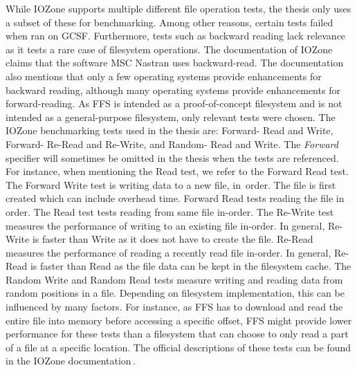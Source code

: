 While IOZone supports multiple different file operation tests, the thesis only uses a subset of these for benchmarking. Among other reasons, certain tests failed when ran on \gls{GCSF}. Furthermore, tests such as backward reading lack relevance as it tests a rare case of filesystem operations. The documentation of IOZone\,\cite{iozoneIozoneFilesystemBenchmark} claims that the software MSC Nastran uses \mbox{backward-read}. The documentation also mentions that only a few operating systems provide enhancements for backward reading, although many operating systems provide enhancements for \mbox{forward-reading}. As \gls{FFS} is intended as a \mbox{proof-of-concept} filesystem and is not intended as a \mbox{general-purpose} filesystem, only relevant tests were chosen. The IOZone benchmarking tests used in the thesis are: Forward- Read and Write, Forward- \mbox{Re-Read} and \mbox{Re-Write}, and Random- Read and Write. The \textit{Forward} specifier will sometimes be omitted in the thesis when the tests are referenced. For instance, when mentioning the Read test, we refer to the Forward Read test. The Forward Write test is writing data to a new file, \mbox{in order}. The file is first created which can include overhead time. Forward Read tests reading the file in order. The Read test tests reading from same file \mbox{in-order}. The \mbox{Re-Write} test measures the performance of writing to an existing file \mbox{in-order}. In general, \mbox{Re-Write} is faster than Write as it does not have to create the file. \mbox{Re-Read} measures the performance of reading a recently read file \mbox{in-order}. In general, \mbox{Re-Read} is faster than \mbox{Read} as the file data can be kept in the filesystem cache. The Random Write and Random Read tests measure writing and reading data from random positions in a file. Depending on filesystem implementation, this can be influenced by many factors. For instance, as \gls{FFS} has to download and read the entire file into memory before accessing a specific offset, \gls{FFS} might provide lower performance for these tests than a filesystem that can choose to only read a part of a file at a specific location. The official descriptions of these tests can be found in the IOZone documentation\,\cite{iozoneIozoneFilesystemBenchmark}.

